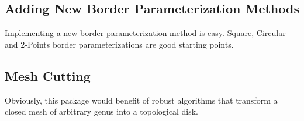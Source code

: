 \subsection{Adding New Border Parameterization Methods}

Implementing a new border parameterization method is easy.
Square, Circular and 2-Points border parameterizations are good starting points.


\subsection{Mesh Cutting}

Obviously, this package would benefit of robust algorithms that transform
a closed mesh of arbitrary genus into a topological disk.
